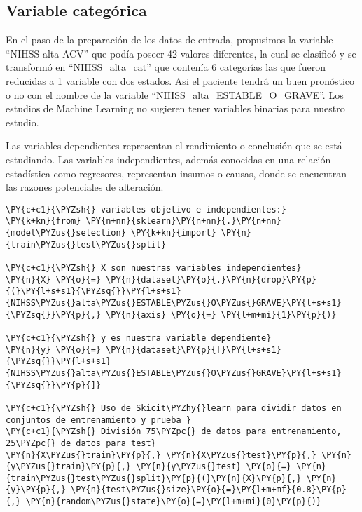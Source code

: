     \hypertarget{variable-categuxf3rica}{%
\subsection{Variable categórica}\label{variable-categuxf3rica}}

En el paso de la preparación de los datos de entrada, propusimos la
variable ``NIHSS alta ACV'' que podía poseer 42 valores diferentes, la
cual se clasificó y se transformó en ``NIHSS\_alta\_cat'' que contenía 6
categorías las que fueron reducidas a 1 variable con dos estados. Asi el
paciente tendrá un buen pronóstico o no con el nombre de la variable
``NIHSS\_alta\_ESTABLE\_O\_GRAVE''. Los estudios de Machine Learning no
sugieren tener variables binarias para nuestro estudio.

Las variables dependientes representan el rendimiento o conclusión que
se está estudiando. Las variables independientes, además conocidas en
una relación estadística como regresores, representan insumos o causas,
donde se encuentran las razones potenciales de alteración.

    \begin{tcolorbox}[breakable, size=fbox, boxrule=1pt, pad at break*=1mm,colback=cellbackground, colframe=cellborder]
\begin{Verbatim}[commandchars=\\\{\}]
\PY{c+c1}{\PYZsh{} variables objetivo e independientes:}
\PY{k+kn}{from} \PY{n+nn}{sklearn}\PY{n+nn}{.}\PY{n+nn}{model\PYZus{}selection} \PY{k+kn}{import} \PY{n}{train\PYZus{}test\PYZus{}split}

\PY{c+c1}{\PYZsh{} X son nuestras variables independientes}
\PY{n}{X} \PY{o}{=} \PY{n}{dataset}\PY{o}{.}\PY{n}{drop}\PY{p}{(}\PY{l+s+s1}{\PYZsq{}}\PY{l+s+s1}{NIHSS\PYZus{}alta\PYZus{}ESTABLE\PYZus{}O\PYZus{}GRAVE}\PY{l+s+s1}{\PYZsq{}}\PY{p}{,} \PY{n}{axis} \PY{o}{=} \PY{l+m+mi}{1}\PY{p}{)}

\PY{c+c1}{\PYZsh{} y es nuestra variable dependiente}
\PY{n}{y} \PY{o}{=} \PY{n}{dataset}\PY{p}{[}\PY{l+s+s1}{\PYZsq{}}\PY{l+s+s1}{NIHSS\PYZus{}alta\PYZus{}ESTABLE\PYZus{}O\PYZus{}GRAVE}\PY{l+s+s1}{\PYZsq{}}\PY{p}{]}

\PY{c+c1}{\PYZsh{} Uso de Skicit\PYZhy{}learn para dividir datos en conjuntos de entrenamiento y prueba }
\PY{c+c1}{\PYZsh{} División 75\PYZpc{} de datos para entrenamiento, 25\PYZpc{} de datos para test}
\PY{n}{X\PYZus{}train}\PY{p}{,} \PY{n}{X\PYZus{}test}\PY{p}{,} \PY{n}{y\PYZus{}train}\PY{p}{,} \PY{n}{y\PYZus{}test} \PY{o}{=} \PY{n}{train\PYZus{}test\PYZus{}split}\PY{p}{(}\PY{n}{X}\PY{p}{,} \PY{n}{y}\PY{p}{,} \PY{n}{test\PYZus{}size}\PY{o}{=}\PY{l+m+mf}{0.8}\PY{p}{,} \PY{n}{random\PYZus{}state}\PY{o}{=}\PY{l+m+mi}{0}\PY{p}{)}
\end{Verbatim}
\end{tcolorbox}

